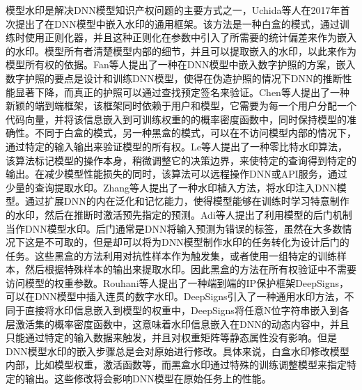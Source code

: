 模型水印\cite{GYKJ202207020}是解决DNN模型知识产权问题的主要方式之一，Uchida等人\cite{uchida2017embedding}在2017年首次提出了在DNN模型中嵌入水印的通用框架。该方法是一种白盒的模式，通过训练时使用正则化器，并且这种正则化在参数中引入了所需要的统计偏差来作为嵌入的水印。模型所有者清楚模型内部的细节，并且可以提取嵌入的水印，以此来作为模型所有权的依据\cite{nagai2018digital}。Fan等人\cite{fan2019rethinking}提出了一种在DNN模型中嵌入数字护照的方案，嵌入数字护照的要点是设计和训练DNN模型，使得在伪造护照的情况下DNN的推断性能显著下降，而真正的护照可以通过查找预定签名来验证。Chen等人\cite{chen2018deepmarks}提出了一种新颖的端到端框架，该框架同时依赖于用户和模型，它需要为每一个用户分配一个代码向量，并将该信息嵌入到可训练权重的的概率密度函数中，同时保持模型的准确性。不同于白盒的模式，另一种黑盒的模式，可以在不访问模型内部的情况下，通过特定的输入输出来验证模型的所有权。Le等人\cite{le2020adversarial}提出了一种零比特水印算法，该算法标记模型的操作本身，稍微调整它的决策边界，来使特定的查询得到特定的输出。在减少模型性能损失的同时，该算法可以远程操作DNN或API服务，通过少量的查询提取水印。Zhang等人\cite{zhang2018protecting}提出了一种水印植入方法，将水印注入DNN模型。通过扩展DNN的内在泛化和记忆能力，使得模型能够在训练时学习特意制作的水印，然后在推断时激活预先指定的预测。Adi等人\cite{adi2018turning}提出了利用模型的后门机制当作DNN模型水印。后门通常是DNN将输入预测为错误的标签，虽然在大多数情况下这是不可取的，但是却可以将为DNN模型制作水印的任务转化为设计后门的任务。这些黑盒的方法利用对抗性样本作为触发集，或者使用一组特定的训练样本，然后根据特殊样本的输出来提取水印。因此黑盒的方法在所有权验证中不需要访问模型的权重参数。Rouhani等人\cite{rouhani2018deepsigns}提出了一种端到端的IP保护框架DeepSigns，可以在DNN模型中插入连贯的数字水印。DeepSigns引入了一种通用水印方法，不同于直接将水印信息嵌入到模型的权重中，DeepSigns将任意N位字符串嵌入到各层激活集的概率密度函数中，这意味着水印信息嵌入在DNN的动态内容中，并且只能通过特定的输入数据来触发，并且对权重矩阵等静态属性没有影响。但是DNN模型水印的嵌入步骤总是会对原始进行修改。具体来说，白盒水印修改模型内部，比如模型权重，激活函数等，而黑盒水印通过特殊的训练调整模型来指定特定的输出。这些修改将会影响DNN模型在原始任务上的性能。

